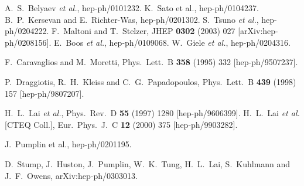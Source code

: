 \documentclass[paper]{JHEP3}
\begin{document}
\begin{thebibliography}{99}
A.~S.~Belyaev {\it et al.},
hep-ph/0101232.
K.~Sato et al., 
hep-ph/0104237.
B.~P.~Kersevan and E.~Richter-Was,
hep-ph/0201302.
S.~Tsuno {\it et al.}, 
hep-ph/0204222.
F.~Maltoni and T.~Stelzer,
JHEP {\bf 0302} (2003) 027
[arXiv:hep-ph/0208156].
E.~Boos {\it et al.},
hep-ph/0109068.
W.~Giele {\it et al.},
hep-ph/0204316.

F.~Caravaglios and M.~Moretti,
Phys.\ Lett.\ B {\bf 358} (1995) 332
[hep-ph/9507237].

P.~Draggiotis, R.~H.~Kleiss and C.~G.~Papadopoulos,
Phys.\ Lett.\ B {\bf 439} (1998) 157
[hep-ph/9807207].

H.~L.~Lai {\it et al.},
Phys.\ Rev.\ D {\bf 55} (1997) 1280
[hep-ph/9606399].
H.~L.~Lai {\it et al.}  [CTEQ Coll.],
Eur.\ Phys.\ J.\ C {\bf 12} (2000) 375
[hep-ph/9903282].

J.~Pumplin et al., 
hep-ph/0201195.

D.~Stump, J.~Huston, J.~Pumplin, W.~K.~Tung, H.~L.~Lai, S.~Kuhlmann and J.~F.~Owens,
arXiv:hep-ph/0303013.


\end{thebibliography}
\end{document}
